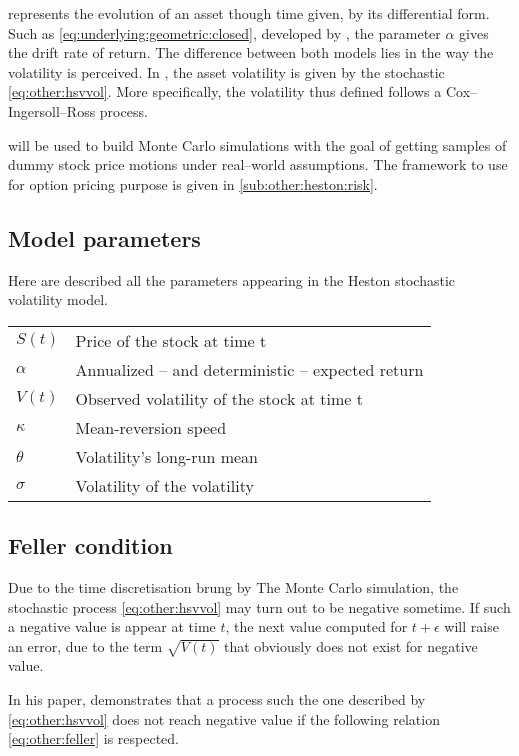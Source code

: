 \documentclass[a4paper, 12pt]{report}
\begin{document}
 represents the evolution of an asset though time given, by its differential form. Such as \cref{eq:underlying:geometric:closed}, developed by \citet{bs}, the parameter $\alpha$ gives the drift rate of return. The difference between both models lies in the way the volatility is perceived. In \citet{heston1993}, the asset volatility is given by the stochastic \cref{eq:other:hsvvol}. More specifically, the volatility thus defined follows a Cox--Ingersoll--Ross process.

 will be used to build Monte Carlo simulations with the goal of getting samples of dummy stock price motions under real--world assumptions. The framework to use for option pricing purpose is given in \cref{sub:other:heston:risk}.

\subsection{Model parameters}
\label{sub:other:heston:model}

Here are described all the parameters appearing in the Heston stochastic volatility model.

\begin{tabular}{ll}
  $S(t)$ & Price of the stock at time t \\
  $\alpha$ &  Annualized -- and deterministic -- expected return \\
  $V(t)$ & Observed volatility of the stock at time t \\
  $\kappa$ & Mean-reversion speed \\
  $\theta$ & Volatility's long-run mean \\
  $\sigma$ & Volatility of the volatility 
\end{tabular}

\subsection{Feller condition}
\label{sub:other:heston:feller}

Due to the time discretisation brung by The Monte Carlo simulation, the stochastic process \ref{eq:other:hsvvol} may turn out to be negative sometime. If such a negative value is appear at time $t$, the next value computed for $t+\epsilon$ will raise an error, due to the term $\sqrt{V(t)}$ that obviously does not exist for negative value.

In his paper, \citet{feller1951} demonstrates that a process such the one described by \cref{eq:other:hsvvol} does not reach negative value if the following relation \ref{eq:other:feller} is respected.
\end{document}
